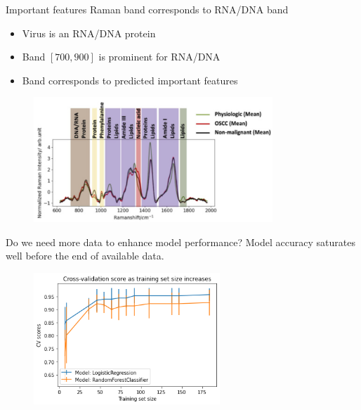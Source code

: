 \begin{frame}{Important features Raman band corresponds to RNA/DNA band}

\vspace{0.1cm}
\begin{itemize}
    \item Virus is an RNA/DNA protein
    \item Band $\left[700,900\right]$ is prominent for RNA/DNA
    \item Band corresponds to predicted important features
\end{itemize}
\begin{figure}
		\includegraphics[width=9.0cm]{figures/virus_raman.PNG}
	\end{figure}
\end{frame}

\begin{frame}{Do we need more data to enhance model performance?}
Model accuracy saturates well before the end of available data.
\vspace{0.1cm}
\begin{figure}
		\includegraphics[width=7.0cm]{figures/cv_train_size.png}
	\end{figure}
\center{\textcolor{blue}{No need for more data.}}
\end{frame}


